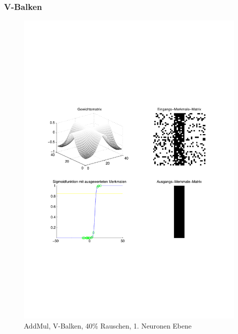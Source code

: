 \subsubsection{V-Balken}
\begin{figure}[hbt]
	\begin{minipage}{0.8 \textwidth}
		\includegraphics[width=\textwidth]{./Bilder/Auswertung/Endergebnis/TypeAddMul_Rauschen40_V_Line_Layer1}
		\caption{AddMul, V-Balken, 40\% Rauschen, 1. Neuronen Ebene}
		\label{AddMul_V_40_1}
	\end{minipage}
	\vfill
	\begin{minipage}{0.8 \textwidth}

\end{minipage}
\end{figure}
